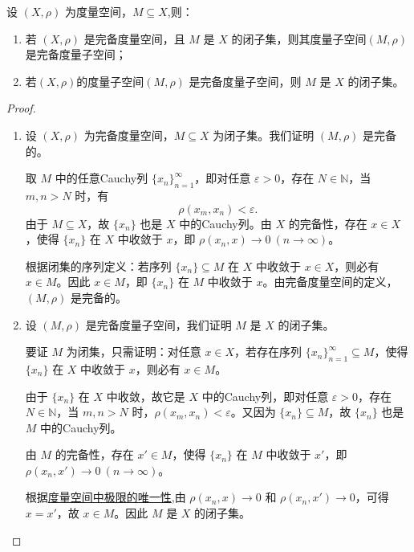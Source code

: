 \documentclass[../../main.tex]{subfiles}%
\begin{document}
\begin{proposition}\label{proposition:完备度量空间的子空间等价于闭集}
设 $(X, \rho)$ 为度量空间，$M \subseteq X$,则：
\begin{enumerate}[(1)]
\item\label{proposition:完备度量空间的子空间等价于闭集-1} 若 $(X, \rho)$ 是完备度量空间，且 $M$ 是 $X$ 的闭子集，则其度量子空间$(M, \rho)$ 是完备度量子空间；

\item\label{proposition:完备度量空间的子空间等价于闭集-2} 若$(X, \rho)$的度量子空间$(M, \rho)$ 是完备度量子空间，则 $M$ 是 $X$ 的闭子集。
\end{enumerate}
\end{proposition}
\begin{proof}
\begin{enumerate}[(1)]
\item 设 $(X, \rho)$ 为完备度量空间，$M \subseteq X$ 为闭子集。我们证明 $(M, \rho)$ 是完备的。

取 $M$ 中的任意Cauchy列 $\{x_n\}_{n=1}^\infty$，即对任意 $\varepsilon > 0$，存在 $N \in \mathbb{N}$，当 $m,n > N$ 时，有
\[
\rho(x_m, x_n) < \varepsilon.
\]
由于 $M \subseteq X$，故 $\{x_n\}$ 也是 $X$ 中的Cauchy列。由 $X$ 的完备性，存在 $x \in X$，使得 $\{x_n\}$ 在 $X$ 中收敛于 $x$，即 $\rho(x_n, x) \to 0 \ (n \to \infty)$。

根据闭集的序列定义：若序列 $\{x_n\} \subseteq M$ 在 $X$ 中收敛于 $x \in X$，则必有 $x \in M$。因此 $x \in M$，即 $\{x_n\}$ 在 $M$ 中收敛于 $x$。由完备度量空间的定义，$(M, \rho)$ 是完备的。

\item 设 $(M, \rho)$ 是完备度量子空间，我们证明 $M$ 是 $X$ 的闭子集。

要证 $M$ 为闭集，只需证明：对任意 $x \in X$，若存在序列 $\{x_n\}_{n=1}^\infty \subseteq M$，使得 $\{x_n\}$ 在 $X$ 中收敛于 $x$，则必有 $x \in M$。

由于 $\{x_n\}$ 在 $X$ 中收敛，故它是 $X$ 中的Cauchy列，即对任意 $\varepsilon > 0$，存在 $N \in \mathbb{N}$，当 $m,n > N$ 时，$\rho(x_m, x_n) < \varepsilon$。又因为 $\{x_n\} \subseteq M$，故 $\{x_n\}$ 也是 $M$ 中的Cauchy列。

由 $M$ 的完备性，存在 $x' \in M$，使得 $\{x_n\}$ 在 $M$ 中收敛于 $x'$，即 $\rho(x_n, x') \to 0 \ (n \to \infty)$。

根据\hyperref[theorem:度量空间中收敛序列极限的唯一性和序列有界性]{度量空间中极限的唯一性},由 $\rho(x_n, x) \to 0$ 和 $\rho(x_n, x') \to 0$，可得 $x = x'$，故 $x \in M$。因此 $M$ 是 $X$ 的闭子集。
\end{enumerate}
\end{proof}
\end{document}
